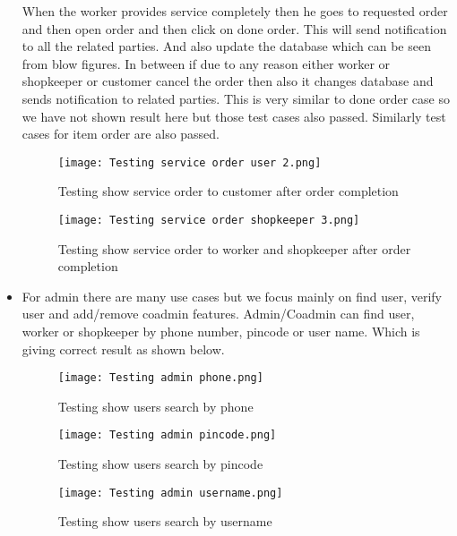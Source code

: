 \documentclass[conference]{IEEEtran}
\begin{document}
\begin{itemize}
    When the worker provides service completely then he goes to requested order and then open order and then click on done order. This will send notification to all the related parties. And also update the database which can be seen from blow figures. In between if due to any reason either worker or shopkeeper or customer cancel the order then also it changes database and sends notification to related parties. This is very similar to done order case so we have not shown result here but those test cases also passed. Similarly test cases for item order are also passed.
    \begin{figure}[H]
        \centering
        \texttt{[image: Testing service order user 2.png]}
        \caption{Testing show service order to customer after order completion}
        \label{fig:testServiceOrderUser2}
    \end{figure}
    \begin{figure}[H]
        \centering
        \texttt{[image: Testing service order shopkeeper 3.png]}
        \caption{Testing show service order to worker and shopkeeper after order completion}
        \label{fig:testServiceOrderShopkeeper3}
    \end{figure}
    
    \item For admin there are many use cases but we focus mainly on find user, verify user and add/remove coadmin features. Admin/Coadmin can find user, worker or shopkeeper by phone number, pincode or user name. Which is giving correct result as shown below.
    \begin{figure}[H]
        \centering
        \texttt{[image: Testing admin phone.png]}
        \caption{Testing show users search by phone}
        \label{fig:testAdminPhone}
    \end{figure}
    \begin{figure}[H]
        \centering
        \texttt{[image: Testing admin pincode.png]}
        \caption{Testing show users search by pincode}
        \label{fig:testAdminPincode}
    \end{figure}
    \begin{figure}[H]
        \centering
        \texttt{[image: Testing admin username.png]}
        \caption{Testing show users search by username}
        \label{fig:testAdminUsername}
    \end{figure}
    

\end{itemize}
\end{document}
